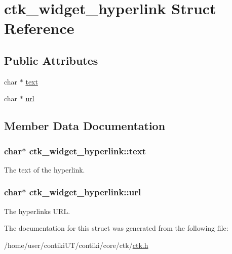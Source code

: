 \hypertarget{structctk__widget__hyperlink}{}\section{ctk\+\_\+widget\+\_\+hyperlink Struct Reference}
\label{structctk__widget__hyperlink}
\subsection*{Public Attributes}
\begin{DoxyCompactItemize}
\item 
char $\ast$ \hyperlink{structctk__widget__hyperlink_a9f58c7dde14dd74173380cd4c9c197ba}{text}
\item 
char $\ast$ \hyperlink{structctk__widget__hyperlink_a04ea01d0a5496eb0dd79459a63d92357}{url}
\end{DoxyCompactItemize}


\subsection{Member Data Documentation}
\hypertarget{structctk__widget__hyperlink_a9f58c7dde14dd74173380cd4c9c197ba}{}
\subsubsection[{text}]{\setlength{\rightskip}{0pt plus 5cm}char$\ast$ ctk\+\_\+widget\+\_\+hyperlink\+::text}\label{structctk__widget__hyperlink_a9f58c7dde14dd74173380cd4c9c197ba}
The text of the hyperlink. \hypertarget{structctk__widget__hyperlink_a04ea01d0a5496eb0dd79459a63d92357}{}
\subsubsection[{url}]{\setlength{\rightskip}{0pt plus 5cm}char$\ast$ ctk\+\_\+widget\+\_\+hyperlink\+::url}\label{structctk__widget__hyperlink_a04ea01d0a5496eb0dd79459a63d92357}
The hyperlink\textquotesingle{}s U\+R\+L. 

The documentation for this struct was generated from the following file\+:\begin{DoxyCompactItemize}
\item 
/home/user/contiki\+U\+T/contiki/core/ctk/\hyperlink{ctk_8h}{ctk.\+h}\end{DoxyCompactItemize}
